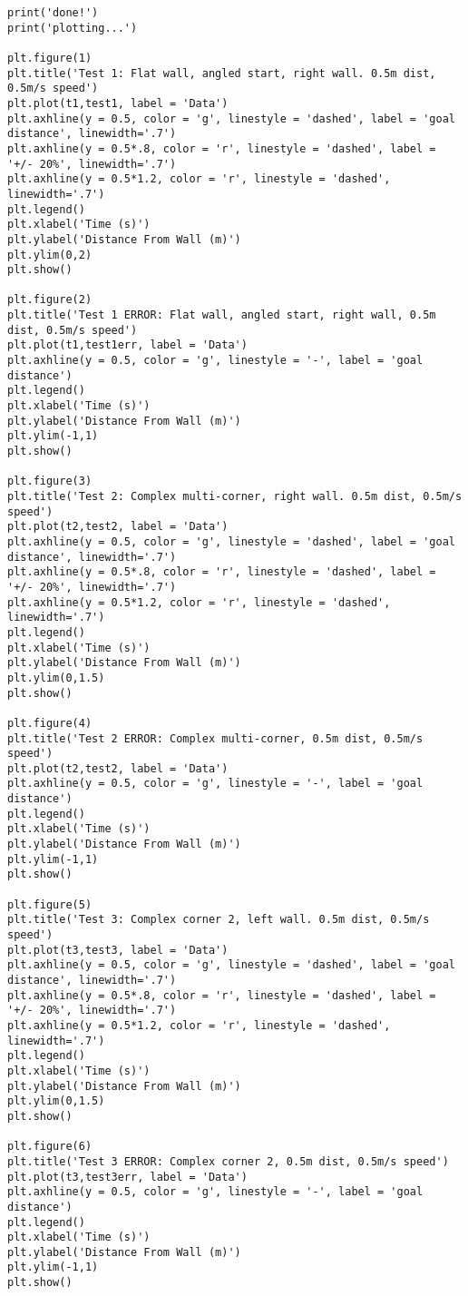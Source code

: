 \documentclass{article}
\begin{document}
{\begin{verbatim}
print('done!')
print('plotting...')

plt.figure(1)
plt.title('Test 1: Flat wall, angled start, right wall. 0.5m dist, 0.5m/s speed')
plt.plot(t1,test1, label = 'Data')
plt.axhline(y = 0.5, color = 'g', linestyle = 'dashed', label = 'goal distance', linewidth='.7')
plt.axhline(y = 0.5*.8, color = 'r', linestyle = 'dashed', label = '+/- 20%', linewidth='.7')
plt.axhline(y = 0.5*1.2, color = 'r', linestyle = 'dashed', linewidth='.7')
plt.legend()
plt.xlabel('Time (s)')
plt.ylabel('Distance From Wall (m)')
plt.ylim(0,2)
plt.show()

plt.figure(2)
plt.title('Test 1 ERROR: Flat wall, angled start, right wall, 0.5m dist, 0.5m/s speed')
plt.plot(t1,test1err, label = 'Data')
plt.axhline(y = 0.5, color = 'g', linestyle = '-', label = 'goal distance')
plt.legend()
plt.xlabel('Time (s)')
plt.ylabel('Distance From Wall (m)')
plt.ylim(-1,1)
plt.show()

plt.figure(3)
plt.title('Test 2: Complex multi-corner, right wall. 0.5m dist, 0.5m/s speed')
plt.plot(t2,test2, label = 'Data')
plt.axhline(y = 0.5, color = 'g', linestyle = 'dashed', label = 'goal distance', linewidth='.7')
plt.axhline(y = 0.5*.8, color = 'r', linestyle = 'dashed', label = '+/- 20%', linewidth='.7')
plt.axhline(y = 0.5*1.2, color = 'r', linestyle = 'dashed', linewidth='.7')
plt.legend()
plt.xlabel('Time (s)')
plt.ylabel('Distance From Wall (m)')
plt.ylim(0,1.5)
plt.show()

plt.figure(4)
plt.title('Test 2 ERROR: Complex multi-corner, 0.5m dist, 0.5m/s speed')
plt.plot(t2,test2, label = 'Data')
plt.axhline(y = 0.5, color = 'g', linestyle = '-', label = 'goal distance')
plt.legend()
plt.xlabel('Time (s)')
plt.ylabel('Distance From Wall (m)')
plt.ylim(-1,1)
plt.show()

plt.figure(5)
plt.title('Test 3: Complex corner 2, left wall. 0.5m dist, 0.5m/s speed')
plt.plot(t3,test3, label = 'Data')
plt.axhline(y = 0.5, color = 'g', linestyle = 'dashed', label = 'goal distance', linewidth='.7')
plt.axhline(y = 0.5*.8, color = 'r', linestyle = 'dashed', label = '+/- 20%', linewidth='.7')
plt.axhline(y = 0.5*1.2, color = 'r', linestyle = 'dashed', linewidth='.7')
plt.legend()
plt.xlabel('Time (s)')
plt.ylabel('Distance From Wall (m)')
plt.ylim(0,1.5)
plt.show()

plt.figure(6)
plt.title('Test 3 ERROR: Complex corner 2, 0.5m dist, 0.5m/s speed')
plt.plot(t3,test3err, label = 'Data')
plt.axhline(y = 0.5, color = 'g', linestyle = '-', label = 'goal distance')
plt.legend()
plt.xlabel('Time (s)')
plt.ylabel('Distance From Wall (m)')
plt.ylim(-1,1)
plt.show()


\end{verbatim}}
\end{document}
